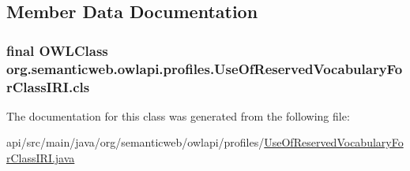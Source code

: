 \subsection{Member Data Documentation}
\hypertarget{classorg_1_1semanticweb_1_1owlapi_1_1profiles_1_1_use_of_reserved_vocabulary_for_class_i_r_i_a5bfc7920add73d5d5f4a275cdbe6a649}{
\subsubsection[{cls}]{\setlength{\rightskip}{0pt plus 5cm}final {\bf O\-W\-L\-Class} org.\-semanticweb.\-owlapi.\-profiles.\-Use\-Of\-Reserved\-Vocabulary\-For\-Class\-I\-R\-I.\-cls\hspace{0.3cm}{\ttfamily [private]}}}\label{classorg_1_1semanticweb_1_1owlapi_1_1profiles_1_1_use_of_reserved_vocabulary_for_class_i_r_i_a5bfc7920add73d5d5f4a275cdbe6a649}


The documentation for this class was generated from the following file\-:\begin{DoxyCompactItemize}
\item 
api/src/main/java/org/semanticweb/owlapi/profiles/\hyperlink{_use_of_reserved_vocabulary_for_class_i_r_i_8java}{Use\-Of\-Reserved\-Vocabulary\-For\-Class\-I\-R\-I.\-java}\end{DoxyCompactItemize}
